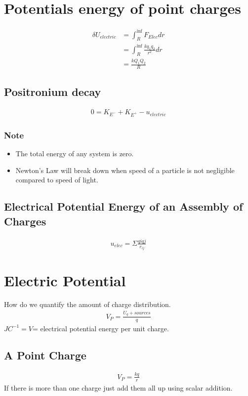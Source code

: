 \documentclass[12pt]{article}
\begin{document}
\section{Potentials energy of point charges}
\begin{align*}
\delta U_{electric} &=\int_{R}^{\inf} F_{Elec}dr \\
&=\int_{R}^{\inf} \frac{kq_1q_2}{r^2} dr  \\
&=\frac{kQ_1Q_2}{R}
\end{align*}
\subsection{Positronium decay}
\begin{align*}
0=K_{E^-}+K_{E^+}-u_{electric}
\end{align*}
\subsubsection{Note}
\begin{itemize}
\item The total energy of any system is zero.
\item Newton's Law will break down when speed of a particle is not negligible compared to speed of light.
\end{itemize}

\subsection{Electrical Potential Energy of an Assembly of Charges} 
\begin{align*}
u_{elec}=\Sigma{\frac{qiqj}{r_{ij}}}
\end{align*}

\pagebreak
\section{Electric Potential}
How do we quantify the amount of charge distribution.\\
\begin{align*}
V_{P}=\frac{U_q+sources}{q}
\end{align*}
$JC^{-1} = V $= electrical potential energy per unit charge.

\subsection{A Point Charge}
\begin{align*}
V_{P}=\frac{kq}{r}
\end{align*}
If there is more than one charge just add them all up using scalar addition.
\end{document}

